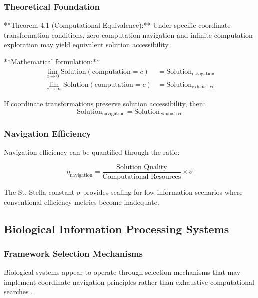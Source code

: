 \documentclass[11pt]{article}
\begin{document}
\subsubsection{Theoretical Foundation}

**Theorem 4.1 (Computational Equivalence):** Under specific coordinate transformation conditions, zero-computation navigation and infinite-computation exploration may yield equivalent solution accessibility.

**Mathematical formulation:**
\begin{align}
\lim_{c \to 0} \text{Solution}(\text{computation} = c) &= \text{Solution}_{\text{navigation}} \\
\lim_{c \to \infty} \text{Solution}(\text{computation} = c) &= \text{Solution}_{\text{exhaustive}}
\label{eq:computational_equivalence}
\end{align}

If coordinate transformations preserve solution accessibility, then:
\begin{equation}
\text{Solution}_{\text{navigation}} = \text{Solution}_{\text{exhaustive}}
\label{eq:navigation_exhaustive_equivalence}
\end{equation}

\subsubsection{Navigation Efficiency}

Navigation efficiency can be quantified through the ratio:

\begin{equation}
\eta_{\text{navigation}} = \frac{\text{Solution Quality}}{\text{Computational Resources}} \times \sigma
\label{eq:navigation_efficiency}
\end{equation}

The St. Stella constant $\sigma$ provides scaling for low-information scenarios where conventional efficiency metrics become inadequate.

\subsection{Biological Information Processing Systems}

\subsubsection{Framework Selection Mechanisms}

Biological systems appear to operate through selection mechanisms that may implement coordinate navigation principles rather than exhaustive computational searches \cite{friston2010free, clark2013whatever}.
\end{document}
